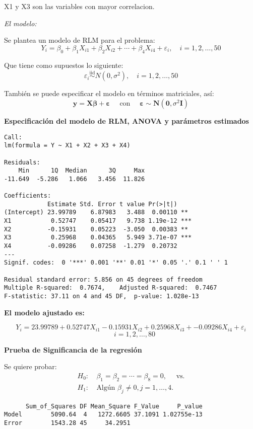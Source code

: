 \documentclass[
]{article}
\begin{document}
X1 y X3 son las variables con mayor correlacion.

\emph{El modelo:}

Se plantea un modelo de RLM para el problema:
\[Y_i = \beta_0 + \beta_1X_{i1} + \beta_2X_{i2} + \cdots+ \beta_4X_{i4}  + \varepsilon_i, \quad i = 1, 2, \ldots, 50\]

Que tiene como supuestos lo siguiente:
\[\varepsilon_i \overset{\text{iid}}{\sim} N\left(0,\sigma ^2 \right), \quad i = 1, 2, \ldots, 50\]

También se puede especificar el modelo en términos matriciales, así:
\[\boldsymbol{y} = \boldsymbol{X\beta} + \boldsymbol{\varepsilon} \quad \text{ con }\quad \boldsymbol{\varepsilon}\sim\boldsymbol{N}(\boldsymbol{0}, \sigma^2\boldsymbol{I})\]

\textbf{Especificación del modelo de RLM, ANOVA y parámetros estimados}

\begin{verbatim}
Call:
lm(formula = Y ~ X1 + X2 + X3 + X4)

Residuals:
    Min      1Q  Median      3Q     Max 
-11.649  -5.286   1.066   3.456  11.826 

Coefficients:
            Estimate Std. Error t value Pr(>|t|)    
(Intercept) 23.99789    6.87983   3.488  0.00110 ** 
X1           0.52747    0.05417   9.738 1.19e-12 ***
X2          -0.15931    0.05223  -3.050  0.00383 ** 
X3           0.25968    0.04365   5.949 3.71e-07 ***
X4          -0.09286    0.07258  -1.279  0.20732    
---
Signif. codes:  0 '***' 0.001 '**' 0.01 '*' 0.05 '.' 0.1 ' ' 1

Residual standard error: 5.856 on 45 degrees of freedom
Multiple R-squared:  0.7674,    Adjusted R-squared:  0.7467 
F-statistic: 37.11 on 4 and 45 DF,  p-value: 1.028e-13
\end{verbatim}

\textbf{El modelo ajustado es:}

\[Y_i = 23.99789 + 0.52747X_{i1} -0.15931X_{i2} + 0.25968 X_{i3} + -0.09286 X_{i4} + \varepsilon_i\]
\[ \quad i = 1, 2, \ldots, 80\]

\textbf{Prueba de Significancia de la regresión}

Se quiere probar: \[
\begin{aligned}
H_0:&\ \beta_1 = \beta_2 = \cdots = \beta_8 = 0, \quad \text{ vs.}\\
H_1:&\ \text{Algún } \beta_j \neq 0, j = 1, \ldots, 4.
\end{aligned}
\]

\begin{verbatim}
      Sum_of_Squares DF Mean_Square F_Value     P_value
Model        5090.64  4   1272.6605 37.1091 1.02755e-13
Error        1543.28 45     34.2951                    
\end{verbatim}
\end{document}
